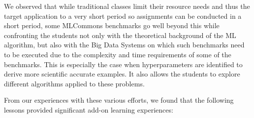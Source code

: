 \documentclass[utf8]{FrontiersinVancouver} %
\begin{document}
We observed that while traditional classes limit their resource needs
and thus the target application to a very short period so assignments
can be conducted in a short period, some MLCommons benchmarks go well
beyond this while confronting the students not only with
the theoretical background of the ML algorithm, but also with the Big Data
Systems on which such benchmarks need to be executed due to the
complexity and time requirements of some of the benchmarks. This is
especially the case when hyperparameters are identified to derive more
scientific accurate examples. It also allows the students to explore
different algorithms applied to these problems.

From our experiences with these various efforts, we found that the
following lessons provided significant add-on learning experiences:
\end{document}
